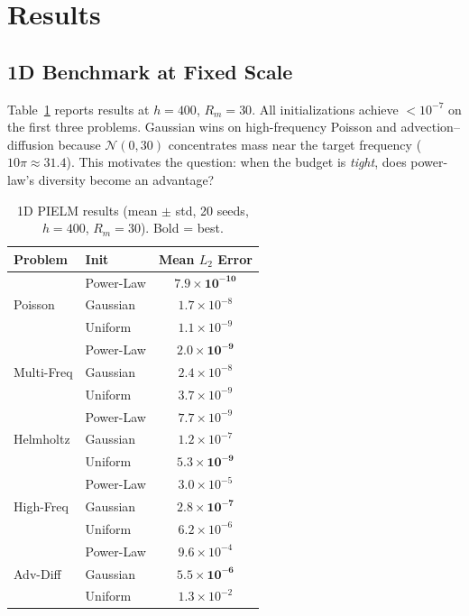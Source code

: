 \documentclass[final,12pt,3p,times,fleqn]{elsarticle}
\begin{document}
\section{Results}
\label{sec:results}

\subsection{1D Benchmark at Fixed Scale}
\label{sec:benchmark}

Table~\ref{tab:benchmark} reports results at $h = 400$, $R_m = 30$. All initializations achieve $< 10^{-7}$ on the first three problems. Gaussian wins on high-frequency Poisson and advection--diffusion because $\mathcal{N}(0, 30)$ concentrates mass near the target frequency ($10\pi \approx 31.4$). This motivates the question: when the budget is \emph{tight}, does power-law's diversity become an advantage?

\begin{table}[htbp]
\centering
\caption{1D PIELM results (mean $\pm$ std, 20 seeds, $h{=}400$, $R_m{=}30$). Bold = best.}
\label{tab:benchmark}
\begin{tabular}{@{}llc@{}}
\toprule
\textbf{Problem} & \textbf{Init} & \textbf{Mean $L_2$ Error} \\
\midrule
\multirow{3}{*}{Poisson}
  & Power-Law & $\mathbf{7.9 \times 10^{-10}}$ \\
  & Gaussian    & $1.7 \times 10^{-8}$ \\
  & Uniform     & $1.1 \times 10^{-9}$ \\
\midrule
\multirow{3}{*}{Multi-Freq}
  & Power-Law & $\mathbf{2.0 \times 10^{-9}}$ \\
  & Gaussian    & $2.4 \times 10^{-8}$ \\
  & Uniform     & $3.7 \times 10^{-9}$ \\
\midrule
\multirow{3}{*}{Helmholtz}
  & Power-Law & $7.7 \times 10^{-9}$ \\
  & Gaussian    & $1.2 \times 10^{-7}$ \\
  & Uniform     & $\mathbf{5.3 \times 10^{-9}}$ \\
\midrule
\multirow{3}{*}{High-Freq}
  & Power-Law & $3.0 \times 10^{-5}$ \\
  & Gaussian    & $\mathbf{2.8 \times 10^{-7}}$ \\
  & Uniform     & $6.2 \times 10^{-6}$ \\
\midrule
\multirow{3}{*}{Adv-Diff}
  & Power-Law & $9.6 \times 10^{-4}$ \\
  & Gaussian    & $\mathbf{5.5 \times 10^{-6}}$ \\
  & Uniform     & $1.3 \times 10^{-2}$ \\
\bottomrule
\end{tabular}
\end{table}
\end{document}
